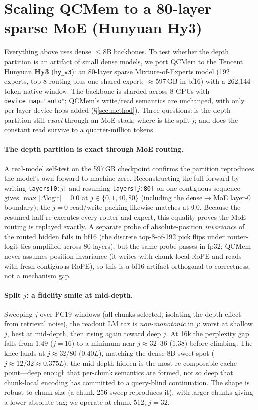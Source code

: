 \section{Scaling QCMem to a 80-layer sparse MoE (Hunyuan Hy3)}
\label{sec:hy3}
Everything above uses dense $\le$8B backbones. To test whether the depth
partition is an artifact of small dense models, we port QCMem to the Tencent
Hunyuan \textbf{Hy3} (\texttt{hy\_v3}): an 80-layer sparse
Mixture-of-Experts model (192 experts, top-8 routing plus one shared expert;
$\approx$597\,GB in bf16) with a 262{,}144-token native window. The backbone is
sharded across 8 GPUs with \texttt{device\_map="auto"}; QCMem's write/read
semantics are unchanged, with only per-layer device hops added
(\S\ref{sec:method}). Three questions: is the depth partition still
\emph{exact} through an MoE stack; where is the split $j$; and does the constant
read survive to a quarter-million tokens.

\paragraph{The depth partition is exact through MoE routing.} A real-model
self-test on the 597\,GB checkpoint confirms the partition reproduces the
model's own forward to machine zero. Reconstructing the full forward by writing
\texttt{layers[0:$j$]} and resuming \texttt{layers[$j$:80]} on one contiguous
sequence gives $\max|\Delta\text{logit}|{=}0.0$ at $j\in\{0,1,40,80\}$
(including the dense$\to$MoE layer-0 boundary); the $j{=}0$ read/write packing
likewise matches at $0.0$. Because the resumed half re-executes every router and
expert, this equality proves the MoE routing is replayed exactly. A separate
probe of absolute-position \emph{invariance} of the routed hidden fails in bf16
(the discrete top-8-of-192 pick flips under router-logit ties amplified across
80 layers), but the same probe passes in fp32; QCMem never assumes
position-invariance (it writes with chunk-local RoPE and reads with fresh
contiguous RoPE), so this is a bf16 artifact orthogonal to correctness, not a
mechanism gap.

\paragraph{Split $j$: a fidelity smile at mid-depth.} Sweeping $j$ over PG19
windows (all chunks selected, isolating the depth effect from retrieval noise),
the readout LM tax is \emph{non-monotonic} in $j$: worst at shallow $j$, best at
mid-depth, then rising again toward deep $j$. At 16k the perplexity gap falls
from $1.49$ ($j{=}16$) to a minimum near $j{\approx}32$--$36$ ($1.38$) before
climbing. The knee lands at $j{\approx}32/80$ ($0.40L$), matching the dense-8B
sweet spot ($j{\approx}12/32\approx0.375L$): the mid-depth hidden is the most
re-composable cache point---deep enough that per-chunk semantics are formed, not
so deep that chunk-local encoding has committed to a query-blind continuation.
The shape is robust to chunk size (a chunk-256 sweep reproduces it), with larger
chunks giving a lower absolute tax; we operate at chunk 512, $j{=}32$.

